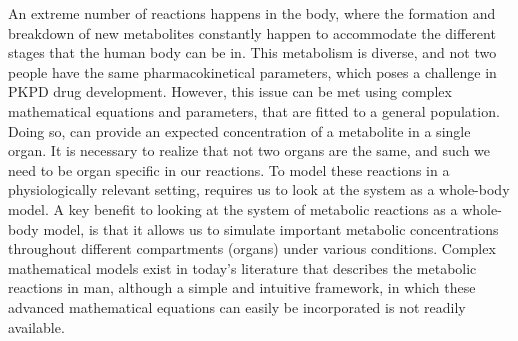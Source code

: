 \documentclass{IEEEtran}
\begin{document}






An extreme number of reactions happens in the body, where the formation and breakdown of new metabolites constantly happen to accommodate the different stages that the human body can be in. This metabolism is diverse, and not two people have the same pharmacokinetical parameters, which poses a challenge in PKPD drug development. However, this issue can be met using complex mathematical equations and parameters, that are fitted to a general population. Doing so, can provide an expected concentration of a metabolite in a single organ. It is necessary to realize that not two organs are the same, and such we need to be organ specific in our reactions. To model these reactions in a physiologically relevant setting, requires us to look at the system as a whole-body model. A key benefit to looking at the system of metabolic reactions as a whole-body model, is that it allows us to simulate important metabolic concentrations throughout different compartments (organs) under various conditions. Complex mathematical models exist in today's literature  that describes the metabolic reactions in man\cite{dash_li_kim_saidel_cabrera_2008,panunzi_pompa_borri_piemonte_gaetano_2020, sorensen_1978, yasemi_jolicoeur_2021}, although a simple and intuitive framework, in which these advanced mathematical equations can easily be incorporated is not readily available.
\end{document}
